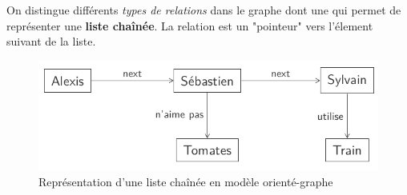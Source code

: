 \item{}
{\faux}
{
On distingue différents \textit{types de relations} dans le graphe dont une qui permet de représenter une \textbf{liste chaînée}. La relation est un "pointeur" vers l'élement suivant de la liste.
\begin{figure}[h!]
\center\includegraphics[scale=.3]{images/graphe-relation-liste}
\caption{Représentation d'une liste chaînée en modèle orienté-graphe \cite{ref1}}
\end{figure}
}


